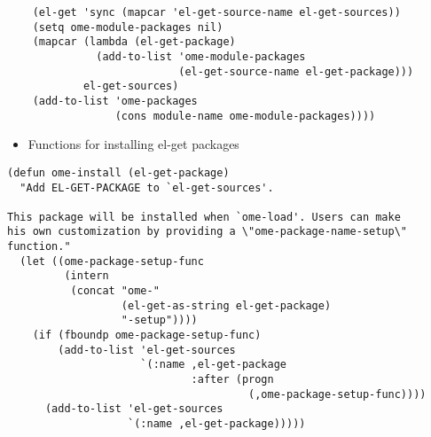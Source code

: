 \documentclass[11pt]{article}
\begin{document}
\begin{verbatim}
    (el-get 'sync (mapcar 'el-get-source-name el-get-sources))
    (setq ome-module-packages nil)
    (mapcar (lambda (el-get-package)
              (add-to-list 'ome-module-packages
                           (el-get-source-name el-get-package)))
            el-get-sources)
    (add-to-list 'ome-packages
                 (cons module-name ome-module-packages))))
\end{verbatim}

\begin{itemize}
\item Functions for installing el-get packages
\end{itemize}

\begin{verbatim}
(defun ome-install (el-get-package)
  "Add EL-GET-PACKAGE to `el-get-sources'.

This package will be installed when `ome-load'. Users can make
his own customization by providing a \"ome-package-name-setup\"
function."
  (let ((ome-package-setup-func
         (intern
          (concat "ome-"
                  (el-get-as-string el-get-package)
                  "-setup"))))
    (if (fboundp ome-package-setup-func)
        (add-to-list 'el-get-sources
                     `(:name ,el-get-package
                             :after (progn
                                      (,ome-package-setup-func))))
      (add-to-list 'el-get-sources
                   `(:name ,el-get-package)))))
\end{verbatim}
\end{document}
